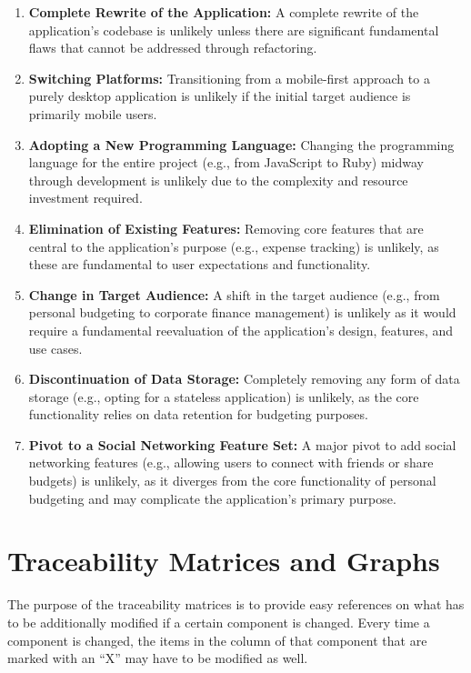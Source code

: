 \documentclass[12pt]{article}
\begin{document}
\begin{enumerate}[label=ULC\arabic*]
	\item \textbf{Complete Rewrite of the Application:} A complete rewrite of the
	application's codebase is unlikely unless there are significant fundamental
	flaws that cannot be addressed through refactoring.
	\item \textbf{Switching Platforms:} Transitioning from a mobile-first approach
	to a purely desktop application is unlikely if the initial target audience is
	primarily mobile users.
	\item \textbf{Adopting a New Programming Language:} Changing the programming
	language for the entire project (e.g., from JavaScript to Ruby) midway through
	development is unlikely due to the complexity and resource investment
	required.
	\item \textbf{Elimination of Existing Features:} Removing core features that
	are central to the application's purpose (e.g., expense tracking) is unlikely,
	as these are fundamental to user expectations and functionality.
	\item \textbf{Change in Target Audience:} A shift in the target audience
	(e.g., from personal budgeting to corporate finance management) is unlikely as
	it would require a fundamental reevaluation of the application's design,
	features, and use cases.
	\item \textbf{Discontinuation of Data Storage:} Completely removing any form
	of data storage (e.g., opting for a stateless application) is unlikely, as the
	core functionality relies on data retention for budgeting purposes.
	\item \textbf{Pivot to a Social Networking Feature Set:} A major pivot to add
	social networking features (e.g., allowing users to connect with friends or
	share budgets) is unlikely, as it diverges from the core functionality of
	personal budgeting and may complicate the application's primary purpose.
\end{enumerate}

\newpage

\section{Traceability Matrices and Graphs}

The purpose of the traceability matrices is to provide easy references on what
has to be additionally modified if a certain component is changed.  Every time a
component is changed, the items in the column of that component that are marked
with an ``X'' may have to be modified as well. 
\end{document}
